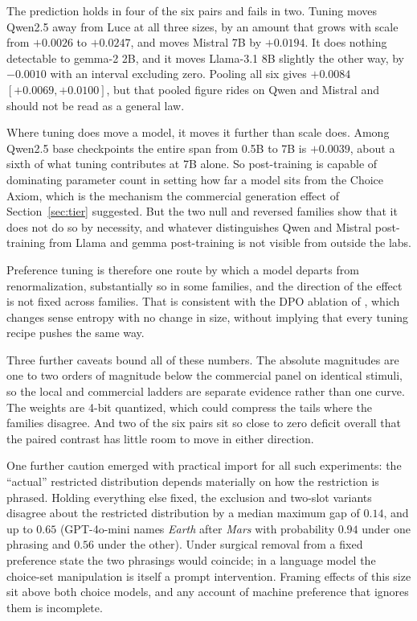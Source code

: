 \documentclass[11pt]{article}
\begin{document}
The prediction holds in four of the six pairs and fails in two. Tuning moves
Qwen2.5 away from Luce at all three sizes, by an amount that grows with scale
from $+0.0026$ to $+0.0247$, and moves Mistral 7B by $+0.0194$. It does
nothing detectable to gemma-2 2B, and it moves Llama-3.1 8B slightly the
other way, by $-0.0010$ with an interval excluding zero. Pooling all six
gives $+0.0084$ $[+0.0069, +0.0100]$, but that pooled figure rides on Qwen
and Mistral and should not be read as a general law.

Where tuning does move a model, it moves it further than scale does. Among
Qwen2.5 base checkpoints the entire span from 0.5B to 7B is $+0.0039$, about
a sixth of what tuning contributes at 7B alone. So post-training is capable
of dominating parameter count in setting how far a model sits from the Choice
Axiom, which is the mechanism the commercial generation effect of
Section~\ref{sec:tier} suggested. But the two null and reversed families show
that it does not do so by necessity, and whatever distinguishes Qwen and
Mistral post-training from Llama and gemma post-training is not visible from
outside the labs.

Preference tuning is therefore one route by which a model departs from
renormalization, substantially so in some families, and the direction of the
effect is not fixed across families. That is consistent with the DPO ablation
of \cite{cekinmez2026}, which changes sense entropy with no change in size,
without implying that every tuning recipe pushes the same way.

Three further caveats bound all of these numbers. The absolute magnitudes are
one to two orders of magnitude below the commercial panel on identical
stimuli, so the local and commercial ladders are separate evidence rather
than one curve. The weights are 4-bit quantized, which could compress the
tails where the families disagree. And two of the six pairs sit so close to
zero deficit overall that the paired contrast has little room to move in
either direction.

One further caution emerged with practical import for all such
experiments: the ``actual'' restricted distribution depends materially on
how the restriction is phrased. Holding everything else fixed, the
exclusion and two-slot variants disagree about the restricted
distribution by a median maximum gap of $0.14$, and up to $0.65$
(GPT-4o-mini names \emph{Earth} after \emph{Mars} with probability
$0.94$ under one phrasing and $0.56$ under the other). Under surgical
removal from a fixed preference state the two phrasings would coincide;
in a language model the choice-set manipulation is itself a prompt
intervention. Framing effects of this size sit above both choice models,
and any account of machine preference that ignores them is incomplete.
\end{document}
